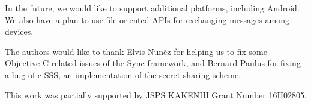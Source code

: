 \documentclass[sigconf]{acmart}
\begin{document}
In the future, we would like to support additional platforms, including Android.
We also have a plan to use file-oriented APIs for exchanging messages among devices.

\begin{acks}
	The authors would like to thank Elvis Nun{\~e}z for helping us to fix some Objective-C related issues of the Sync framework, and Bernard Paulus for fixing a bug of c-SSS, an implementation of the secret sharing scheme.
	
	This work was partially supported by JSPS KAKENHI Grant Number 16H02805.
\end{acks}



 
\end{document}

